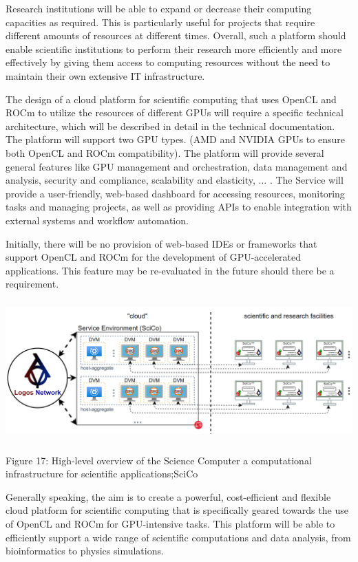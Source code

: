 \documentclass[]{article}
\begin{document}
Research institutions will be able to expand or decrease their computing capacities as required. 
This is particularly useful for projects that require different amounts of resources at different times.
Overall, such a platform should enable scientific institutions to perform their research more efficiently and more effectively by giving them access to computing resources without the need to maintain their own extensive IT infrastructure.

The design of a cloud platform for scientific computing that uses OpenCL and ROCm to utilize the resources of different GPUs will require a specific technical architecture, which will be described in detail in the technical documentation.
The platform will support two GPU types. (AMD and NVIDIA GPUs to ensure both OpenCL and ROCm compatibility).
The platform will provide several general features like GPU management and orchestration, data management and analysis, security and compliance, scalability and elasticity, ... . 
The Service will provide a user-friendly, web-based dashboard for accessing resources, monitoring tasks and managing projects, as well as providing APIs to enable integration with external systems and workflow automation.

Initially, there will be no provision of web-based IDEs or frameworks that support OpenCL and ROCm for the development of GPU-accelerated applications.
This feature may be re-evaluated in the future should there be a requirement. 

\begin{center}
	\includegraphics[height=5.4cm]{scico-overview}
\end{center}
\begin{center}
	Figure 17: High-level overview of the Science Computer a computational infrastructure for scientific applications;SciCo
\end{center}

Generally speaking, the aim is to create a powerful, cost-efficient and flexible cloud platform for scientific computing that is specifically geared towards the use of OpenCL and ROCm for GPU-intensive tasks. 
This platform will be able to efficiently support a wide range of scientific computations and data analysis, from bioinformatics to physics simulations.
\end{document}
